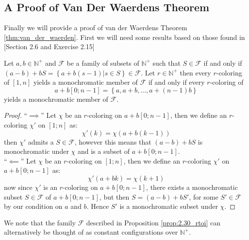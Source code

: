 \subsection{A Proof of Van Der Waerdens Theorem}\label{sec:van_der_waerden_proof}
Finally we will provide a proof of van der Waerdens Theorem \ref{thm:van_der_waerden}. First we will need some results based on those found in \cite{rtoi}[Section 2.6 and Exercise 2.15]

\begin{proposition}\label{prop:2.30_rtoi}
	Let $a, b \in \mathbb{N}^+$ and $\mathcal{F}$ be a family of subsets of $\mathbb{N}^{+}$ such that $S \in \mathcal{F}$ if and only if $(a - b) + bS = \left\{a + b(s - 1) | s \in S\right\} \in \mathcal{F}$. Let $r \in \mathbb{N}^+$ then every $r$-coloring of $[1, n]$ yields a monochromatic member of $\mathcal{F}$ if and only if every $r$-coloring of
	\begin{equation*}
		a + b[0; n - 1] = \left\{a, a + b, \ldots, a + (n - 1)b\right\}
	\end{equation*}
	yields a monochromatic member of $\mathcal{F}$.
\end{proposition}
\begin{proof}
	``$\implies$'' Let $\chi$ be an $r$-coloring on $a + b[0; n - 1]$, then we define an $r$-coloring $\chi'$ on $[1;n]$ as:
	\begin{equation*}
		\chi'(k) = \chi(a + b(k - 1))
	\end{equation*}
	then $\chi'$ admits a $S \in \mathcal{F}$, however this means that $(a - b) + bS$ is monochromatic under $\chi$ and is a subset of $a + b[0; n - 1]$. \\
	``$\impliedby$'' Let $\chi$ be an $r$-coloring on $[1; n]$, then we define an $r$-coloring $\chi'$ on $a + b[0; n - 1]$ as:
	\begin{equation*}
		\chi'(a + bk) = \chi(k + 1)
	\end{equation*}
	now since $\chi'$ is an $r$-coloring on $a + b[0; n - 1]$, there exists a monochromatic subset $S \in \mathcal{F}$ of $a + b[0; n - 1]$, but then $S = (a - b) + bS'$, for some $S' \in \mathcal{F}$ by our condition on $a$ and $b$. Hence $S'$ is a monochromatic subset under $\chi$.
\end{proof}
We note that the family $\mathcal{F}$ described in Proposition \ref{prop:2.30_rtoi} can alternatively be thought of as constant configurations over $\mathbb{N}^{+}$.


